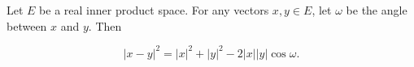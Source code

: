 Let $E$ be a real inner product space. For any vectors $x, y \in E$, let $\omega$ be the angle between $x$ and $y$. Then

$$|x - y|^2 = |x|^2 + |y|^2 - 2|x| |y| \cos \omega.$$
